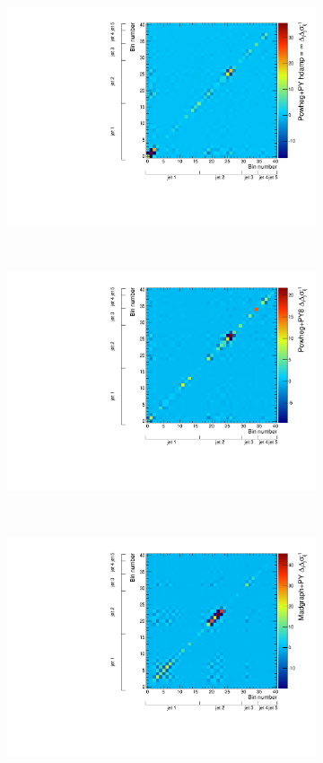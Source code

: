 \begin{figure}
\centering
\begin{subfigure}[]{0.45\textwidth}
\includegraphics[width=\textwidth]{fig/DataUnfold/NLOFS/Chi2/117050atlfast.pdf}
\end{subfigure}
~
\begin{subfigure}[]{0.45\textwidth}
\includegraphics[width=\textwidth]{fig/DataUnfold/NLOFS/Chi2/117046atlfast.pdf}
\end{subfigure}
\\
\begin{subfigure}[]{0.45\textwidth}
\includegraphics[width=\textwidth]{fig/DataUnfold/LOMultiLeg/Chi2/110872atlfast.pdf}

\end{subfigure}
\end{figure}

